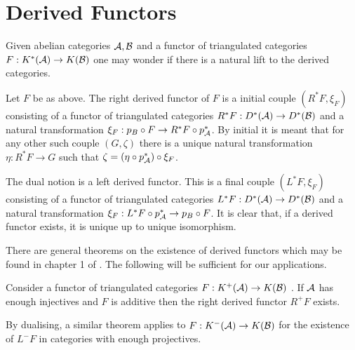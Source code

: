 \section{Derived Functors}
Given abelian categories $\AA, \mathcal{B}$ and a functor of triangulated categories $F:K^*(\AA)\to K(\mathcal{B})$ one may wonder if there is a natural lift to the derived categories.
\begin{definition}
 Let $F$ be as above. The right derived functor of $F$ is a initial couple $(R^*F,\xi_F)$ consisting of a functor of triangulated categories $R^*F:D^*(\AA) \to D^*(\mathcal{B})$ and a natural transformation $\xi_F:p_B\circ F \to R^*F \circ p_\AA^*$.
 By initial it is meant that for any other such couple $(G,\zeta)$ there is a unique natural transformation $\eta: R^*F\to G$ such that $\zeta = (\eta \circ p_\AA^*)\circ \xi_{F}$.
\end{definition}
The dual notion is a left derived functor. This is a final couple $(L^*F,\xi_F)$ consisting of a functor of triangulated categories $L^*F:D^*(\AA) \to D^*(\mathcal{B})$ and a natural transformation $\xi_F:  L^*F \circ p_\AA^* \to p_B\circ F$.
It is clear that, if a derived functor exists, it is unique up to unique isomorphism.

There are general theorems on the existence of derived functors which may be found in chapter 1 of \cite{dimca2004sheaves}.
The following will be sufficient for our applications.
\begin{theorem}{\cite[Remark 1.3.15.]{dimca2004sheaves}}\label{thm: InjectivesAllowDerivedFunctor}
 Consider a functor of triangulated categories $F:K^+(\AA)\to K(\mathcal{B})$ .
 If $\AA$ has enough injectives and $F$ is additive then the right derived functor $R^+F$ exists.
\end{theorem}
By dualising, a similar theorem applies to $F:K^-(\AA)\to K(\mathcal{B})$ for the existence of $L^- F$ in categories with enough projectives.

